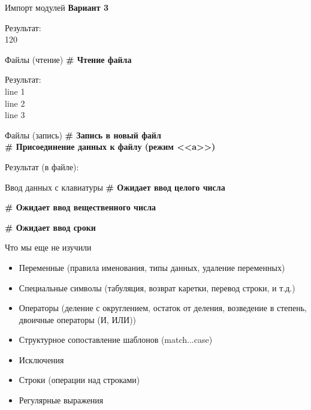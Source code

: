 \documentclass[12pt]{beamer}
\begin{document}
\begin{frame}{Импорт модулей}
\textbf{Вариант 3}
\vspace{0.5cm}

\vspace{0.5cm}
Результат: \\
120 \\
\end{frame}

\begin{frame}{Файлы (чтение)}
\textbf{\# Чтение файла} \\
\vspace{0.5cm}

\vspace{0.5cm}
Результат: \\
line 1 \\
line 2 \\
line 3 \\
\end{frame}


\begin{frame}{Файлы (запись)}
\textbf{\# Запись в новый файл} \\
\textbf{\# Присоединение данных к файлу (режим <<a>>)} \\
\vspace{0.5cm}

\vspace{0.5cm}
Результат (в файле): \\

\end{frame}


\begin{frame}{Ввод данных с клавиатуры}
\vspace{0.3cm}
\textbf{\# Ожидает ввод целого числа} 

\vspace{0.3cm}
\textbf{\# Ожидает ввод вещественного числа} 

\vspace{0.3cm}
\textbf{\# Ожидает ввод сроки} 

\end{frame}


\begin{frame}{Что мы еще не изучили}
\begin{itemize}
\item Переменные (правила именования, типы данных, удаление переменных)
\item Специальные символы (табуляция, возврат каретки, перевод строки, и т.д.)
\item Операторы (деление с округлением, остаток от деления, возведение в степень, двоичные операторы (И, ИЛИ))
\item Структурное сопоставление шаблонов (match...case)
\item Исключения
\item Строки (операции над строками)
\item Регулярные выражения
\end{itemize}
\end{frame}
\end{document}
